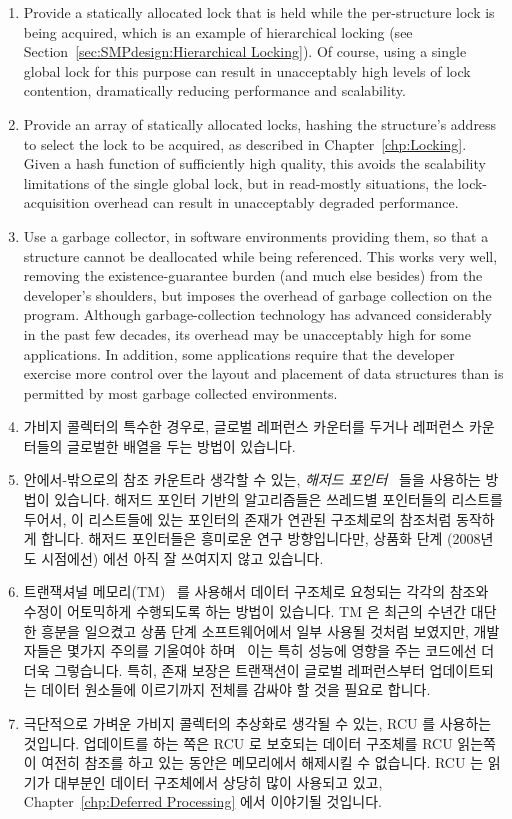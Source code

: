 {\begin{enumerate}
	\item	Provide a statically allocated lock that is held while
		the per-structure lock is being acquired, which is an
		example of hierarchical locking (see
		Section~\ref{sec:SMPdesign:Hierarchical Locking}).
		Of course, using a single global lock for this purpose
		can result in unacceptably high levels of lock contention,
		dramatically reducing performance and scalability.
	\item	Provide an array of statically allocated locks, hashing
		the structure's address to select the lock to be acquired,
		as described in Chapter~\ref{chp:Locking}.
		Given a hash function of sufficiently high quality, this
		avoids the scalability limitations of the single global
		lock, but in read-mostly situations, the lock-acquisition
		overhead can result in unacceptably degraded performance.
	\item	Use a garbage collector, in software environments providing
		them, so that a structure cannot be deallocated while being
		referenced.
		This works very well, removing the existence-guarantee
		burden (and much else besides) from the developer's
		shoulders, but imposes the overhead of garbage collection
		on the program.
		Although garbage-collection technology has advanced
		considerably in the past few decades, its overhead
		may be unacceptably high for some applications.
		In addition, some applications require that the developer
		exercise more control over the layout and placement of
		data structures than is permitted by most garbage collected
		environments.
	\fi
	\item	가비지 콜렉터의 특수한 경우로, 글로벌 레퍼런스 카운터를 두거나
		레퍼런스 카운터들의 글로벌한 배열을 두는 방법이 있습니다.
	\item	안에서-밖으로의 참조 카운트라 생각할 수 있는, \emph{해저드
		포인터}~\cite{MagedMichael04a} 들을 사용하는 방법이 있습니다.
		해저드 포인터 기반의 알고리즘들은 쓰레드별 포인터들의 리스트를
		두어서, 이 리스트들에 있는 포인터의 존재가 연관된 구조체로의
		참조처럼 동작하게 합니다.
		해저드 포인터들은 흥미로운 연구 방향입니다만, 상품화 단계
		(2008년도 시점에선) 에선 아직 잘 쓰여지지 않고 있습니다.
	\item	트랜잭셔널
		메모리(TM)~\cite{Herlihy93a,DBLomet1977SIGSOFT,Shavit95} 를
		사용해서 데이터 구조체로 요청되는 각각의 참조와 수정이
		어토믹하게 수행되도록 하는 방법이 있습니다.
		TM 은 최근의 수년간 대단한 흥분을 일으켰고 상품 단계
		소프트웨어에서 일부 사용될 것처럼 보였지만, 개발자들은 몇가지
		주의를 기울여야
		하며~\cite{Blundell2005DebunkTM,Blundell2006TMdeadlock,McKenney2007PLOSTM}
		이는 특히 성능에 영향을 주는 코드에선 더더욱 그렇습니다.
		특히, 존재 보장은 트랜잭션이 글로벌 레퍼런스부터 업데이트되는
		데이터 원소들에 이르기까지 전체를 감싸야 할 것을 필요로 합니다.
	\item	극단적으로 가벼운 가비지 콜렉터의 추상화로 생각될 수 있는, RCU
		를 사용하는 것입니다.
		업데이트를 하는 쪽은 RCU 로 보호되는 데이터 구조체를 RCU
		읽는쪽이 여전히 참조를 하고 있는 동안은 메모리에서 해제시킬 수
		없습니다.
		RCU 는 읽기가 대부분인 데이터 구조체에서 상당히 많이 사용되고
		있고, Chapter~\ref{chp:Deferred Processing} 에서 이야기될
		것입니다.
	\iffalse


\end{enumerate}}
